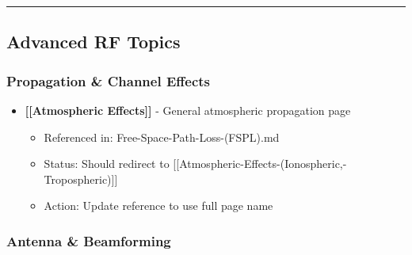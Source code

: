 \begin{center}\rule{0.5\linewidth}{0.5pt}\end{center}

\subsection{\texorpdfstring{ Advanced RF
Topics}{ Advanced RF Topics}}\label{advanced-rf-topics}

\subsubsection{Propagation \& Channel
Effects}\label{propagation-channel-effects}

\begin{itemize}
\tightlist
\item
  \textbf{{[}{[}Atmospheric Effects{]}{]}} - General atmospheric
  propagation page

  \begin{itemize}
  \tightlist
  \item
    Referenced in: Free-Space-Path-Loss-(FSPL).md
  \item
    Status: Should redirect to
    {[}{[}Atmospheric-Effects-(Ionospheric,-Tropospheric){]}{]}
  \item
    Action: Update reference to use full page name
  \end{itemize}
\end{itemize}

\subsubsection{Antenna \& Beamforming}\label{antenna-beamforming}

